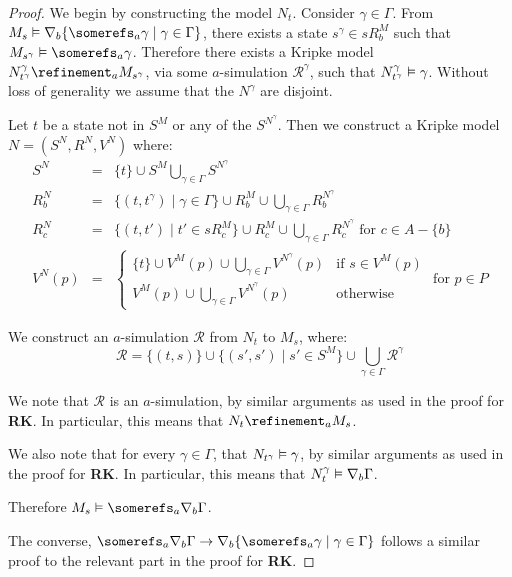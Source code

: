 \begin{proof}
We begin by constructing the model $N_t$. Consider $\gamma \in \Gamma$. From
$M_s \entails \covers_b \{ \somerefs_a \gamma \mid \gamma \in \Gamma \}$, there
exists a state $s^\gamma \in sR^M_b$ such that $M_{s^\gamma} \entails
\somerefs_a \gamma$. Therefore there exists a Kripke model $N^\gamma_{t^\gamma}
\refinement_a M_{s^\gamma}$, via some $a$-simulation $\mathcal{R}^\gamma$, such
that $N^\gamma_{t^\gamma} \vDash \gamma$. Without loss of generality we assume
that the $N^\gamma$ are disjoint.

Let $t$ be a state not in $S^M$ or any of the $S^{N^\gamma}$. Then we construct a
Kripke model $N = (S^N, R^N, V^N)$ where:
\begin{eqnarray*}
S^N &=& \{t\} \cup S^M \bigcup_{\gamma \in \Gamma} S^{N^\gamma}\\
R^N_b &=& \{(t, t^\gamma) \mid \gamma \in \Gamma\} 
\cup  R^M_b 
\cup \bigcup_{\gamma \in \Gamma} R^{N^\gamma}_b\\
R^N_c &=& \{(t, t') \mid t' \in sR^M_c\} 
\cup R^M_c \cup \bigcup_{\gamma \in \Gamma} R^{N^\gamma}_c \text{ for $c \in A - \{b\}$}\\
V^N(p) &=& 
\begin{cases}
\displaystyle \{t\} \cup V^M(p) \cup \bigcup_{\gamma \in \Gamma} V^{N^\gamma}(p)
& \text{if $s \in V^M(p)$}\\
\displaystyle V^M(p) \cup \bigcup_{\gamma \in \Gamma} V^{N^\gamma}(p) &
\text{otherwise}
\end{cases}
\text{ for $p \in P$}
\end{eqnarray*}

We construct an $a$-simulation $\mathcal{R}$ from $N_t$ to $M_s$, where:
$$\mathcal{R} = \{(t, s)\} \cup \{(s', s') \mid s' \in S^M\} \cup
\bigcup_{\gamma \in \Gamma} \mathcal{R}^\gamma$$

We note that $\mathcal{R}$ is an $a$-simulation, by similar arguments as used in
the proof for {\bf RK}. In particular, this means that $N_t \refinement_a M_s$.

We also note that for every $\gamma \in \Gamma$, that $N_{t^\gamma} \vDash
\gamma$, by similar arguments as used in the proof for {\bf RK}. In particular,
this means that $N^\gamma_t \vDash \nabla_b \Gamma$.

Therefore $M_s \entails \somerefs_a \covers_b \Gamma$.

The converse, $\somerefs_a \covers_b \Gamma \implies \covers_b \{\somerefs_a
\gamma \mid \gamma \in \Gamma\}$ follows a similar proof to the relevant part in
the proof for {\bf RK}.


\end{proof}
